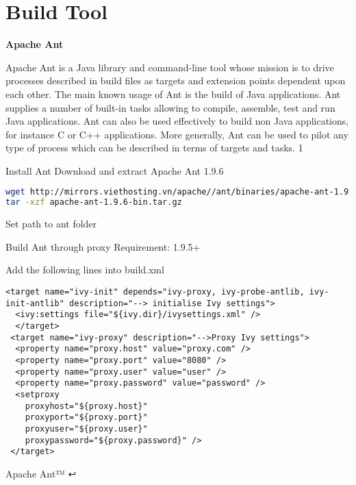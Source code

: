\chapter{Build Tool}

\textbf{Apache Ant}

Apache Ant is a Java library and command-line tool whose mission is to drive processes described in build files as targets and extension points dependent upon each other. The main known usage of Ant is the build of Java applications. Ant supplies a number of built-in tasks allowing to compile, assemble, test and run Java applications. Ant can also be used effectively to build non Java applications, for instance C or C++ applications. More generally, Ant can be used to pilot any type of process which can be described in terms of targets and tasks. 1

Install Ant
Download and extract Apache Ant 1.9.6

\begin{lstlisting}[language=bash]
wget http://mirrors.viethosting.vn/apache//ant/binaries/apache-ant-1.9.6-bin.tar.gz
tar -xzf apache-ant-1.9.6-bin.tar.gz
\end{lstlisting}

Set path to ant folder

Build Ant through proxy
Requirement: 1.9.5+

Add the following lines into build.xml

\begin{lstlisting}
<target name="ivy-init" depends="ivy-proxy, ivy-probe-antlib, ivy-init-antlib" description="--> initialise Ivy settings">
  <ivy:settings file="${ivy.dir}/ivysettings.xml" />
  </target>
 <target name="ivy-proxy" description="-->Proxy Ivy settings">
  <property name="proxy.host" value="proxy.com" />
  <property name="proxy.port" value="8080" />
  <property name="proxy.user" value="user" />
  <property name="proxy.password" value="password" />
  <setproxy
    proxyhost="${proxy.host}"
    proxyport="${proxy.port}"
    proxyuser="${proxy.user}"
    proxypassword="${proxy.password}" />
 </target>
\end{lstlisting}

Apache Ant™ ↩